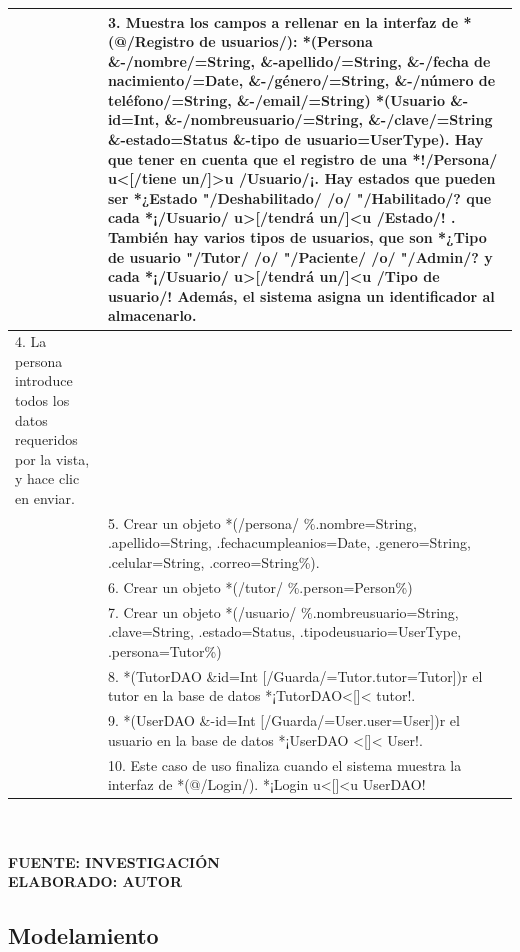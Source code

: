 \begin{table}[]
	\centering
	\begin{tabular}{| p{7cm} | p{7cm} |}
		\hline
		& 3. Muestra los campos a rellenar en la interfaz de *(@/Registro de usuarios/): *(Persona \&-/nombre/=String, \&-apellido/=String, \&-/fecha de nacimiento/=Date, \&-/género/=String, \&-/número de teléfono/=String, \&-/email/=String) *(Usuario \&-id=Int, \&-/nombreusuario/=String, \&-/clave/=String \&-estado=Status \&-tipo de usuario=UserType). Hay que tener en cuenta que el registro de una *!/Persona/ u<[/tiene un/]>u /Usuario/¡. Hay estados que pueden ser *¿Estado "/Deshabilitado/ /o/ "/Habilitado/? que cada *¡/Usuario/ u>[/tendrá un/]<u /Estado/! . También hay varios tipos de usuarios, que son *¿Tipo de usuario "/Tutor/ /o/ "/Paciente/ /o/ "/Admin/? y cada *¡/Usuario/ u>[/tendrá un/]<u /Tipo de usuario/! Además, el sistema asigna un identificador al almacenarlo.  \\ \hline
		4. La persona introduce todos los datos requeridos por la vista, y hace clic en enviar. & \\ \hline
		& 5. Crear un objeto *(/persona/ \%.nombre=String, .apellido=String, .fechacumpleanios=Date, .genero=String, .celular=String, .correo=String\%). \\ \hline
		& 6. Crear un objeto *(/tutor/ \%.person=Person\%) \\ \hline
		& 7. Crear un objeto *(/usuario/ \%.nombreusuario=String, .clave=String, .estado=Status, .tipodeusuario=UserType, .persona=Tutor\%) \\ \hline
		& 8. *(TutorDAO \&id=Int [/Guarda/=Tutor{.tutor=Tutor}])r el tutor en la base de datos *¡TutorDAO<[]< tutor!. \\ \hline
		& 9. *(UserDAO \&-id=Int [/Guarda/=User{.user=User}])r el usuario en la base de datos *¡UserDAO <[]< User!. \\ \hline
		& 10. Este caso de uso finaliza cuando el sistema muestra la interfaz de  *(@/Login/). *¡Login u<[]<u UserDAO! \\ \hline
	\end{tabular} \\
\vspace{4mm}
{\footnotesize \textbf{\\ FUENTE: INVESTIGACIÓN} \textbf{\\ ELABORADO: AUTOR}}
\end{table}

\subsection{Modelamiento}

